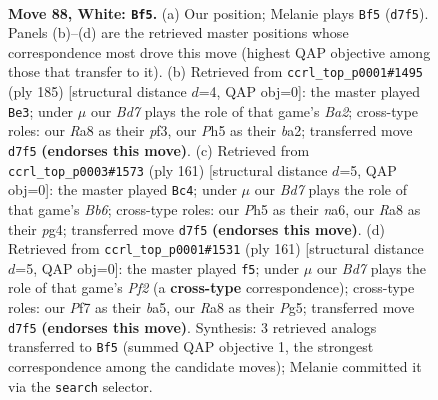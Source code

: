 \documentclass[11pt]{article}
\begin{document}
\clearpage

\begin{figure}[p]\centering
\begin{subfigure}{0.46\textwidth}\centering
\resizebox{\linewidth}{!}{%
\newchessgame
\chessboard[
  setfen={R7/3B1P2/8/7P/2k5/8/8/7K w - - 7 88},
  showmover=false,
  pgfstyle=straightmove, color=movearrow, markmove={d7-f5}
]}
\caption{}
\end{subfigure}\hfill
\begin{subfigure}{0.46\textwidth}\centering
\resizebox{\linewidth}{!}{%
\newchessgame
\chessboard[
  setfen={3k4/b7/8/4p3/8/5P2/B7/4K3 b - - 8 93},
  showmover=false,
  pgfstyle=straightmove, color=movearrow, markmove={a7-e3}
]}
\caption{}
\end{subfigure}
\\[4pt]
\begin{subfigure}{0.46\textwidth}\centering
\resizebox{\linewidth}{!}{%
\newchessgame
\chessboard[
  setfen={8/8/N7/6p1/3k2P1/1b6/8/4K3 b - - 5 81},
  showmover=false,
  pgfstyle=straightmove, color=movearrow, markmove={b3-c4}
]}
\caption{}
\end{subfigure}\hfill
\begin{subfigure}{0.46\textwidth}\centering
\resizebox{\linewidth}{!}{%
\newchessgame
\chessboard[
  setfen={8/5p2/8/B2k2p1/6P1/8/8/K7 b - - 5 81},
  showmover=false,
  pgfstyle=straightmove, color=movearrow, markmove={f7-f5}
]}
\caption{}
\end{subfigure}
\caption{\textbf{Move 88, White: \texttt{Bf5}.} (a) Our position; Melanie plays \texttt{Bf5} (\texttt{d7f5}). Panels (b)--(d) are the retrieved master positions whose correspondence most drove this move (highest QAP objective among those that transfer to it). (b) Retrieved from \texttt{ccrl\_top\_p0001\#1495} (ply 185) [structural distance $d$=4, QAP obj=0]: the master played \texttt{Be3}; under $\mu$ our \emph{Bd7} plays the role of that game's \emph{Ba2}; cross-type roles: our \emph{R}a8 as their \emph{p}f3, our \emph{P}h5 as their \emph{b}a2; transferred move \texttt{d7f5} \textbf{(endorses this move)}. (c) Retrieved from \texttt{ccrl\_top\_p0003\#1573} (ply 161) [structural distance $d$=5, QAP obj=0]: the master played \texttt{Bc4}; under $\mu$ our \emph{Bd7} plays the role of that game's \emph{Bb6}; cross-type roles: our \emph{P}h5 as their \emph{n}a6, our \emph{R}a8 as their \emph{p}g4; transferred move \texttt{d7f5} \textbf{(endorses this move)}. (d) Retrieved from \texttt{ccrl\_top\_p0001\#1531} (ply 161) [structural distance $d$=5, QAP obj=0]: the master played \texttt{f5}; under $\mu$ our \emph{Bd7} plays the role of that game's \emph{Pf2} (a \textbf{cross-type} correspondence); cross-type roles: our \emph{P}f7 as their \emph{b}a5, our \emph{R}a8 as their \emph{P}g5; transferred move \texttt{d7f5} \textbf{(endorses this move)}. Synthesis: 3 retrieved analogs transferred to \texttt{Bf5} (summed QAP objective 1, the strongest correspondence among the candidate moves); Melanie committed it via the \texttt{search} selector.}
\label{fig:thought-m174}
\end{figure}
\end{document}
